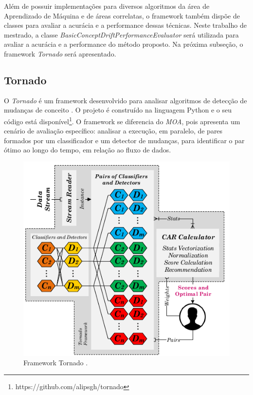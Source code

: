 \documentclass[msc, classic, a4paper]{ufbathesis}
\begin{document}
Além de possuir implementações para diversos algoritmos da área de Aprendizado de Máquina e de áreas correlatas, o framework também dispõe de classes para avaliar a acurácia e a performance dessas técnicas.
Neste trabalho de mestrado, a classe \textit{BasicConceptDriftPerformanceEvaluator} será utilizada para avaliar a acurácia e a performance do método proposto.
Na próxima subseção, o framework \textit{Tornado} será apresentado.

\subsection{Tornado}

O \textit{Tornado} é um framework desenvolvido para analisar algoritmos de detecção de mudanças de conceito \cite{Pesaranghader:Tornado}.
O projeto é construído na linguagem Python e o seu código está disponível\footnote{https://github.com/alipsgh/tornado}.
O framework se diferencia do \textit{MOA}, pois apresenta um cenário de avaliação específico:
analisar a execução, em paralelo, de pares formados por um classificador e um detector de mudanças,
para identificar o par ótimo ao longo do tempo, em relação ao fluxo de dados.

\begin{figure}[H]
\begin{center}
    \includegraphics[scale=0.75]{imagens/tornado.png}
    \caption{Framework Tornado \cite{Pesaranghader:Tornado}.}
    \label{fig:tornado}
\end{center}
\end{figure}
\end{document}
